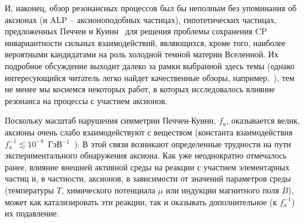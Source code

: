 %

И, наконец, обзор резонансных процессов был бы неполным без упоминания об 
аксионах (и ALP -- аксионоподобных частицах), 
гипотетических частицах, предложенных Печчеи и Куинн~\cite{Quinn:1977} для 
решения проблемы сохранения CP инвариантности сильных взаимодействий, 
являющихся, кроме того, наиболее вероятными кандидатами на роль холодной темной 
материи Вселенной. Их подробное обсуждение выходит далеко за рамки выбранной 
здесь темы (однако интересующийся читатель легко найдет качественные обзоры, 
например,~\cite{Kim:2010, Marsh:2016}), тем не менее мы коснемся некоторых 
работ, в которых исследовалось влияние резонанса на процессы с участием 
аксионов.

Поскольку масштаб нарушения симметрии Печчеи-Куинн, $f_a$, оказывается велик, аксионы очень слабо взаимодействуют с веществом (константа взаимодействия $f_a^{-1} \lesssim 10^{-8}$\, ГэВ$^{-1}$~\cite{Raffelt:1996}). В этой связи возникают определенные трудности на пути экспериментального обнаружения аксиона. Как уже неоднократно отмечалось ранее, влияние внешней активной среды на реакции с участием элементарных частиц и, в частности,  аксионов, в зависимости от значений параметров среды (температуры  $T$, химического потенциала  $\mu$ или индукции магнитного поля  $B$), может как катализировать эти реакции, так и оказывать дополнительное (к $f_a^{-1}$) их подавление.

